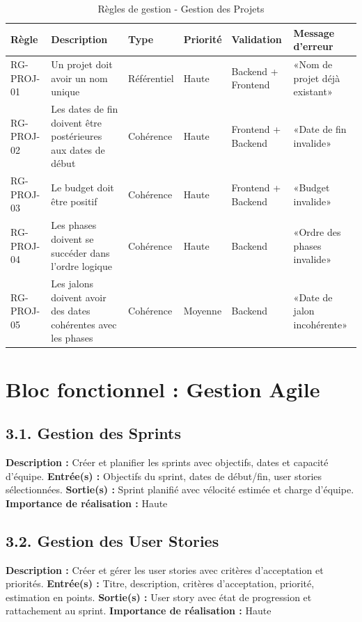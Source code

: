 \begin{table}[H]
\centering
\footnotesize
\begin{tabular}{|p{1.5cm}|p{3.5cm}|p{1.5cm}|p{1.5cm}|p{2cm}|p{2.5cm}|}
\hline
\textbf{Règle} & \textbf{Description} & \textbf{Type} & \textbf{Priorité} & \textbf{Validation} & \textbf{Message d'erreur} \\
\hline
RG-PROJ-01 & Un projet doit avoir un nom unique & Référentiel & Haute & Backend + Frontend & «Nom de projet déjà existant» \\
\hline
RG-PROJ-02 & Les dates de fin doivent être postérieures aux dates de début & Cohérence & Haute & Frontend + Backend & «Date de fin invalide» \\
\hline
RG-PROJ-03 & Le budget doit être positif & Cohérence & Haute & Frontend + Backend & «Budget invalide» \\
\hline
RG-PROJ-04 & Les phases doivent se succéder dans l'ordre logique & Cohérence & Haute & Backend & «Ordre des phases invalide» \\
\hline
RG-PROJ-05 & Les jalons doivent avoir des dates cohérentes avec les phases & Cohérence & Moyenne & Backend & «Date de jalon incohérente» \\
\hline
\end{tabular}
\caption{Règles de gestion - Gestion des Projets}
\label{tab:rg_projets}
\end{table}

\section{Bloc fonctionnel : Gestion Agile}

\subsection{3.1. Gestion des Sprints}
\textbf{Description :} Créer et planifier les sprints avec objectifs, dates et capacité d'équipe.
\textbf{Entrée(s) :} Objectifs du sprint, dates de début/fin, user stories sélectionnées.
\textbf{Sortie(s) :} Sprint planifié avec vélocité estimée et charge d'équipe.
\textbf{Importance de réalisation :} Haute

\subsection{3.2. Gestion des User Stories}
\textbf{Description :} Créer et gérer les user stories avec critères d'acceptation et priorités.
\textbf{Entrée(s) :} Titre, description, critères d'acceptation, priorité, estimation en points.
\textbf{Sortie(s) :} User story avec état de progression et rattachement au sprint.
\textbf{Importance de réalisation :} Haute

